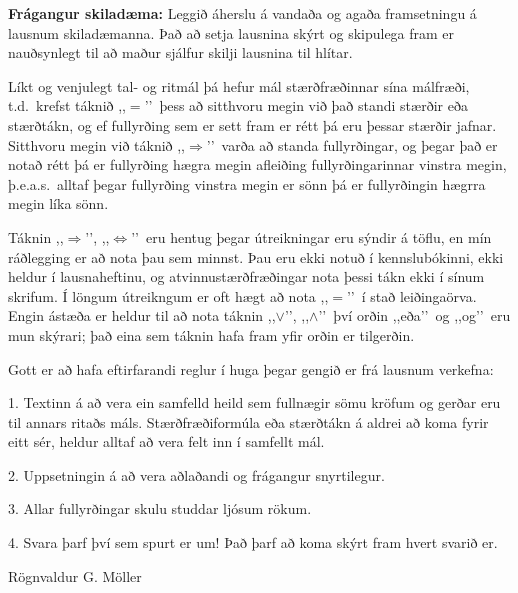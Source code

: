 \documentclass[12pt]{article}
\begin{document}
{\bf Frágangur skiladæma:}  
Leggið áherslu á vandaða og agaða framsetningu á lausnum
skiladæmanna.  Það að setja lausnina skýrt og skipulega fram er
nauðsynlegt til að maður sjálfur skilji lausnina til hlítar.  
   
Líkt og venjulegt tal- og ritmál þá hefur mál stærðfræðinnar sína 
málfræði, t.d.\ krefst táknið ,,$=$\rq\rq\ þess að sitthvoru megin 
við það standi stærðir eða stærðtákn, og ef fullyrðing sem er sett fram 
er rétt þá eru þessar stærðir jafnar.  Sitthvoru megin við 
táknið ,,$\Rightarrow$\rq\rq\ 
varða að standa fullyrðingar, og þegar það 
er notað rétt þá er fullyrðing hægra megin afleiðing  
fullyrðingarinnar  vinstra megin, þ.e.a.s.\ alltaf þegar fullyrðing 
vinstra megin er sönn þá er fullyrðingin hægrra megin líka sönn.

Táknin  ,,$\Rightarrow$\rq\rq, ,,$\Leftrightarrow$\rq\rq\ 
eru hentug þegar 
útreikningar eru sýndir á töflu, en mín ráðlegging er að nota þau sem 
minnst.   
Þau eru ekki notuð í kennslubókinni, ekki heldur í 
lausnaheftinu, og atvinnustærðfræðingar nota 
þessi tákn ekki í sínum skrifum.  Í  löngum
útreikngum er oft hægt að nota  ,,$=$\rq\rq\  í stað leiðingaörva. 
Engin ástæða er heldur til að nota 
táknin ,,$\vee$\rq\rq, ,,$\wedge$\rq\rq\ því 
orðin ,,eða\rq\rq\ og {,,}og\rq\rq\ eru 
mun skýrari;  það eina sem táknin hafa fram yfir orðin er tilgerðin.


Gott er að hafa eftirfarandi reglur í huga þegar gengið er frá lausnum 
verkefna:

1. Textinn á að vera ein samfelld heild sem fullnægir sömu kröfum og 
gerðar eru til annars ritaðs máls.  Stærðfræðiformúla eða stærðtákn 
á aldrei að koma fyrir eitt sér, heldur  alltaf 
að vera felt inn í samfellt mál.

2. Uppsetningin á að vera aðlaðandi og frágangur snyrtilegur.

3. Allar fullyrðingar skulu studdar ljósum rökum.

4. Svara þarf því sem spurt er um!  Það þarf að koma
   skýrt fram hvert svarið er. 


\vfill
\hfill  Rögnvaldur G. Möller
\end{document}
